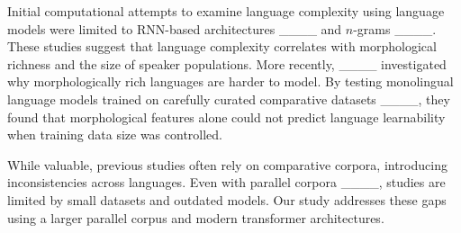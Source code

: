 Initial computational attempts to examine language complexity using language models were limited to RNN-based architectures ____ and $n$-grams ____. These studies suggest that language complexity correlates with morphological richness and the size of speaker populations. More recently, ____ investigated why morphologically rich languages are harder to model. By testing monolingual language models trained on carefully curated comparative datasets ____, they found that morphological features alone could not predict language learnability when training data size was controlled.

While valuable, previous studies often rely on comparative corpora, introducing inconsistencies across languages. Even with parallel corpora ____, studies are limited by small datasets and outdated models. Our study addresses these gaps using a larger parallel corpus and modern transformer architectures.